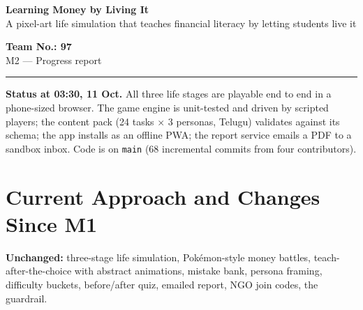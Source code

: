 \documentclass[10pt,a4paper]{article}
\begin{document}
\begin{minipage}[t]{0.70\textwidth}
{\LARGE\bfseries Learning Money by Living It}\\[1pt]
{\color{muted}A pixel-art life simulation that teaches financial literacy by letting students live it}
\end{minipage}\hfill
\begin{minipage}[t]{0.28\textwidth}\raggedleft
{\bfseries Team No.: 97}\\[1pt]
{\small\color{muted}M2 --- Progress report}
\end{minipage}

\vspace{3pt}
{\color{acc}\rule{\textwidth}{1.2pt}}
\vspace{-2pt}

{\small\textbf{Status at 03:30, 11 Oct.} All three life stages are playable end to end in a phone-sized browser. The game engine is unit-tested and driven by scripted players; the content pack (24 tasks $\times$ 3 personas, Telugu) validates against its schema; the app installs as an offline PWA; the report service emails a PDF to a sandbox inbox. Code is on \texttt{main} (68 incremental commits from four contributors).}

\section{Current Approach and Changes Since M1}
\textbf{Unchanged:} three-stage life simulation, Pok\'emon-style money battles, teach-after-the-choice with abstract animations, mistake bank, persona framing, difficulty buckets, before/after quiz, emailed report, NGO join codes, the guardrail.
\end{document}
